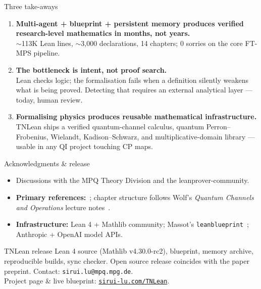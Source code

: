 \documentclass[aspectratio=169,10pt]{beamer}
\begin{document}
\begin{frame}{Three take-aways}
    \begin{enumerate}
        \item \textbf{Multi-agent + blueprint + persistent memory produces verified research-level mathematics in months, not years.}\\
            \textcolor{dimwhite}{\footnotesize $\sim$113K Lean lines, $\sim$3{,}000 declarations, 14 chapters; 0 sorries on the core FT-MPS pipeline.}
        \vspace{0.5em}
        \item \textbf{The bottleneck is intent, not proof search.}\\
            \textcolor{dimwhite}{\footnotesize Lean checks logic; the formalisation fails when a definition silently weakens what is being proved. Detecting that requires an external analytical layer --- today, human review.}
        \vspace{0.5em}
        \item \textbf{Formalising physics produces reusable mathematical infrastructure.}\\
            \textcolor{dimwhite}{\footnotesize TNLean ships a verified quantum-channel calculus, quantum Perron--Frobenius, Wielandt, Kadison--Schwarz, and multiplicative-domain library --- usable in any QI project touching CP maps.}
    \end{enumerate}
\end{frame}

\begin{frame}{Acknowledgments \& release}
    \begin{itemize}
        \item Discussions with the MPQ Theory Division and the leanprover-community.
        \item \textbf{Primary references:}~\cite{Perez-Garcia2007Matrix,Cirac2017Annals,Cirac2021Matrix}; chapter structure follows Wolf's \emph{Quantum Channels and Operations} lecture notes~\cite{Wolf2012Quantum}.
        \item \textbf{Infrastructure:} Lean 4 + Mathlib community; Massot's \texttt{leanblueprint}~\cite{Massot2021Leanblueprint}; Anthropic + OpenAI model APIs.
    \end{itemize}
    \vspace{0.6em}
    \begin{block}{TNLean release}
        \footnotesize
        Lean 4 source (Mathlib v4.30.0-rc2), blueprint, memory archive, reproducible builds, sync checker. Open source release coincides with the paper preprint. Contact: \texttt{sirui.lu@mpq.mpg.de}.\\[0.2em]
        Project page \& live blueprint: \texttt{\href{https://sirui-lu.com/TNLean}{sirui-lu.com/TNLean}}.
    \end{block}
\end{frame}
\end{document}
